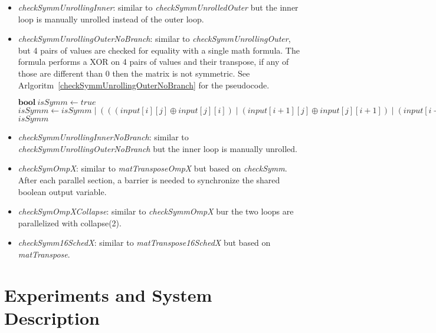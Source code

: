 \documentclass[conference]{IEEEtran}
\begin{document}
\begin{itemize}
\item \textit{checkSymmUnrollingInner}: similar to \textit{checkSymmUnrolledOuter} but the inner loop is manually unrolled instead of the outer loop.
\item \textit{checkSymmUnrollingOuterNoBranch}: similar to \textit{checkSymmUnrollingOuter}, but 4 pairs of values are checked for equality with a single math formula. The formula performs a XOR on 4 pairs of values and their transpose, if any of those are different than 0 then the matrix is not symmetric. See Arlgoritm~\ref{checkSymmUnrollingOuterNoBranch} for the pseudocode.


\begin{algorithm}
	\caption{checkSymmUnrollingOuterNoBranch}\label{checkSymmUnrollingOuterNoBranch}
	\begin{algorithmic}[1]
		\State $\textbf{bool}\ isSymm \gets true$
		\State $isSymm \gets isSymm \mid (((input[i][j] \oplus input[j][i]) \mid (input[i+1][j] \oplus input[j][i+1]) \mid (input[i+2][j] \oplus input[j][i+2]) \mid (input[i+3][j] \oplus input[j][i+3])) != 0)$
		\EndFor
		\EndFor
		\State \Return $isSymm$
	\end{algorithmic}
\end{algorithm}

\item \textit{checkSymmUnrollingInnerNoBranch}: similar to \textit{checkSymmUnrollingOuterNoBranch} but the inner loop is manually unrolled.
\item \textit{checkSymOmpX}: similar to \textit{matTransposeOmpX} but based on \textit{checkSymm}. After each parallel section, a barrier is needed to synchronize the shared boolean output variable.
\item \textit{checkSymOmpXCollapse}: similar to \textit{checkSymmOmpX} bur the two loops are parallelized with collapse(2).
\item \textit{checkSymm16SchedX}: similar to \textit{matTranspose16SchedX} but based on \textit{matTranspose}.
\end{itemize}

\iffalse
Remember: write
- what you did (contribution): high level overview like "hey, i want to test different vectorization ond parallelization implementations"
- how you did it (methodology): we benchmarked algorithm A ... (all the pseudocodes). Whay we mesured

\fi

\section{Experiments and System Description}
\end{document}
